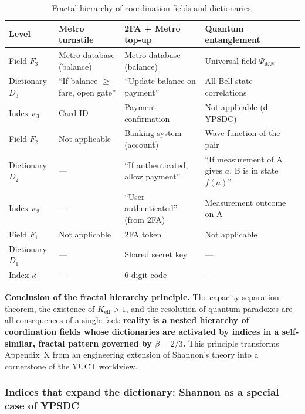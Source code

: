 \documentclass[12pt,a4paper]{article}
\theoremstyle{remark}
\begin{document}
	\begin{table}[htbp]
		\centering
		\caption{Fractal hierarchy of coordination fields and dictionaries.}
		\label{tab:fractal-examples}
		\small
		\begin{tabular}{p{2.2cm} p{3.5cm} p{3.5cm} p{3.5cm}}
			\toprule
			\textbf{Level} & \textbf{Metro turnstile} & \textbf{2FA + Metro top-up} & \textbf{Quantum entanglement} \\
			\midrule
			Field $F_3$ & Metro database (balance) & Metro database (balance) & Universal field $\Psi_{MN}$ \\
			Dictionary $D_3$ & ``If balance $\ge$ fare, open gate'' & ``Update balance on payment'' & All Bell-state correlations \\
			Index $\kappa_3$ & Card ID & Payment confirmation & Not applicable (d-YPSDC) \\
			\midrule
			Field $F_2$ & Not applicable & Banking system (account) & Wave function of the pair \\
			Dictionary $D_2$ & --- & ``If authenticated, allow payment'' & ``If measurement of A gives $a$, B is in state $f(a)$'' \\
			Index $\kappa_2$ & --- & ``User authenticated'' (from 2FA) & Measurement outcome on A \\
			\midrule
			Field $F_1$ & Not applicable & 2FA token & Not applicable \\
			Dictionary $D_1$ & --- & Shared secret key & --- \\
			Index $\kappa_1$ & --- & 6-digit code & --- \\
			\bottomrule
		\end{tabular}
	\end{table}
	
	\noindent
	\textbf{Conclusion of the fractal hierarchy principle.}
	The capacity separation theorem, the existence of $K_{\mathrm{eff}}>1$,
	and the resolution of quantum paradoxes are all consequences of a
	single fact: \textbf{reality is a nested hierarchy of coordination
		fields whose dictionaries are activated by indices in a
		self-similar, fractal pattern governed by $\beta=2/3$.}  This
	principle transforms Appendix~X from an engineering extension of
	Shannon's theory into a cornerstone of the YUCT worldview.
	
	
	\subsubsection{Indices that expand the dictionary:
		Shannon as a special case of YPSDC}
	
\end{document}
